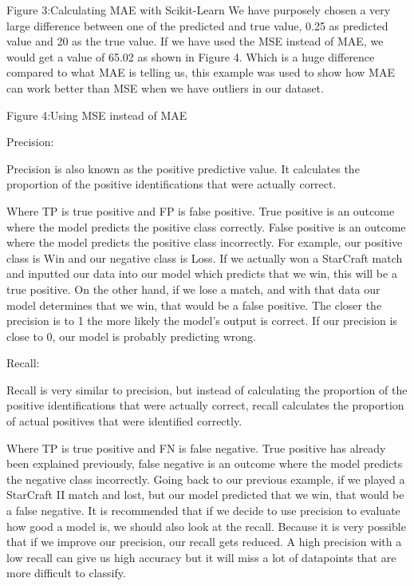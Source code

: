 \documentclass[a4paper,12pt]{report}
\begin{document}
Figure 3:Calculating MAE with Scikit-Learn
We have purposely chosen a very large difference between one of the predicted and true value, 0.25 as predicted value and 20 as the true value. If  we have used the MSE instead of MAE, we would get a value of 65.02 as shown in Figure 4. Which is a huge difference compared to what MAE is telling us, this example was used to show how MAE can work better than MSE when we have outliers in our dataset.


Figure 4:Using MSE instead of MAE
 
Precision:

Precision is also known as the positive predictive value. It calculates the proportion of the positive identifications that were actually correct.



Where TP  is true positive and FP is false positive. True positive is an outcome where the model predicts the positive class correctly. False positive is an outcome where the model predicts the positive class incorrectly. For example, our positive class is Win and our negative class is Loss. If we actually won a StarCraft match and inputted our data into our model which predicts that we win, this will be a true positive. On the other hand, if we lose a match, and with that data our model determines that we win, that would be a false positive. The closer the precision is to 1 the more likely the model’s output is correct. If our precision is close to 0, our model is probably predicting wrong.
 
Recall:

Recall is very similar to precision, but instead of calculating the proportion of the positive identifications that were actually correct, recall calculates the proportion of actual positives that were identified correctly.



Where TP is true positive and FN is false negative. True positive has already been explained previously, false negative is an outcome where the model predicts the negative class incorrectly. Going back to our previous example, if we played a StarCraft II match and lost, but our model predicted that we win, that would be a false negative. It is recommended that if we decide to use precision to evaluate how good a model is, we should also look at the recall. Because it is very possible that if we improve our precision, our recall gets reduced. A high precision with a low recall can give us high accuracy but it will miss a lot of datapoints that are more difficult to classify.
 
\end{document}
